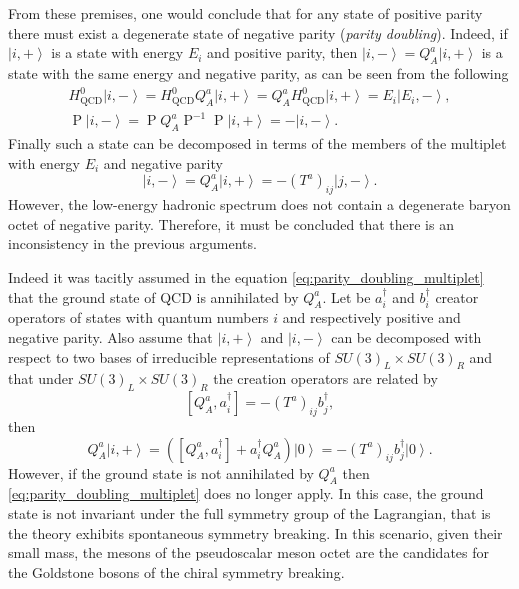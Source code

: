 From these premises, one would conclude that for any state of positive parity there must exist a degenerate state of negative parity (\emph{parity doubling}). Indeed, if $\left\vert i, + \right\rangle$ is a state with energy $E_i$ and positive parity, then $\left\vert i, - \right\rangle = Q^a_A \left\vert i, + \right\rangle$ is a state with the same energy and negative parity, as can be seen from the following
\begin{gather}
  H^0_\text{QCD} \left\vert i, - \right\rangle = H^0_\text{QCD} Q^a_A \left\vert i, + \right\rangle = Q^a_A H^0_\text{QCD} \left\vert i, + \right\rangle = E_i \left\vert E_i, - \right\rangle , \\
  \operatorname{P} \left\vert i, - \right\rangle = \operatorname{P} Q^a_A \operatorname{P}^{-1} \operatorname{P} \left\vert i, + \right\rangle = - \left\vert i, - \right\rangle .
\end{gather}
Finally such a state can be decomposed in terms of the members of the multiplet with energy $E_i$ and negative parity
\begin{equation}
  \left\vert i , - \right\rangle = Q^a_A \left\vert i, + \right\rangle = - (T^a)_{i j} \left\vert j , - \right\rangle .
  \label{eq:parity_doubling_multiplet}
\end{equation}
However, the low-energy hadronic spectrum does not contain a degenerate baryon octet of negative parity. Therefore, it must be concluded that there is an inconsistency in the previous arguments.

Indeed it was tacitly assumed in the equation \eqref{eq:parity_doubling_multiplet} that the ground state of QCD is annihilated by $Q^a_A$. Let be $a^\dagger_i$ and $b^\dagger_i$ creator operators of states with quantum numbers $i$ and respectively positive and negative parity. Also assume that $\left\vert i , + \right\rangle$ and $\left\vert i, - \right\rangle$ can be decomposed with respect to two bases of irreducible representations of $SU(3)_L \times SU(3)_R$ and that under $SU(3)_L \times SU(3)_R$ the creation operators are related by
\begin{equation}
  \left[ Q^a_A , a^\dagger_i \right] = - \left( T^a \right)_{i j} b^\dagger_j ,
\end{equation}
then
\begin{equation}
  Q^a_A \left\vert i , + \right\rangle = \left( \left[ Q^a_A , a^\dagger_i \right] + a^\dagger_i Q^a_A \right) \left\vert 0 \right\rangle = - \left( T^a \right)_{i j} b^\dagger_j \left\vert 0 \right\rangle .
\end{equation}
However, if the ground state is not annihilated by $Q^a_A$ then \eqref{eq:parity_doubling_multiplet} does no longer apply. In this case, the ground state is not invariant under the full symmetry group of the Lagrangian, that is the theory exhibits spontaneous symmetry breaking. In this scenario, given their small mass, the mesons of the pseudoscalar meson octet are the candidates for the Goldstone bosons of the chiral symmetry breaking.

